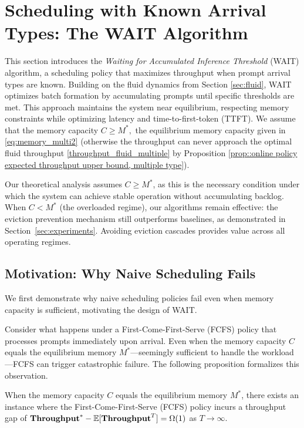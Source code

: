 \section{Scheduling with Known Arrival Types: The WAIT Algorithm}
\label{sec:wait}

This section introduces the \textit{Waiting for Accumulated Inference Threshold} (WAIT) algorithm, a scheduling policy that maximizes throughput when prompt arrival types are known. Building on the fluid dynamics from Section \ref{sec:fluid}, WAIT optimizes batch formation by accumulating prompts until specific thresholds are met. This approach maintains the system near equilibrium, respecting memory constraints while optimizing latency and time-to-first-token (TTFT). We assume that the memory capacity $C\ge M^*,$ the equilibrium memory capacity given in \eqref{eq:memory_multi2} (otherwise the throughput can never approach the optimal fluid throughput \eqref{throughput_fluid_multiple} by Proposition \ref{prop::online policy expected throughput upper bound, multiple type}).

\begin{remark}
\label{remark:memory_assumption}
Our theoretical analysis assumes $C \geq M^*$, as this is the necessary condition under which the system can achieve stable operation without accumulating backlog. When $C < M^*$ (the overloaded regime), our algorithms remain effective: the eviction prevention mechanism still outperforms baselines, as demonstrated in Section~\ref{sec:experiments}. Avoiding eviction cascades provides value across all operating regimes.
\end{remark}

\subsection{Motivation: Why Naive Scheduling Fails}
\label{subsec:wait_motivation}

We first demonstrate why naive scheduling policies fail even when memory capacity is sufficient, motivating the design of WAIT.

Consider what happens under a First-Come-First-Serve (FCFS) policy that processes prompts immediately upon arrival. Even when the memory capacity $C$ equals the equilibrium memory $M^*$---seemingly sufficient to handle the workload---FCFS can trigger catastrophic failure. The following proposition formalizes this observation.

\begin{proposition}\label{prop:lower_bound_FCFS}
When the memory capacity \(C\) equals the equilibrium memory \(M^*\), there exists an instance where the First-Come-First-Serve (FCFS) policy incurs a throughput gap of \(\textbf{Throughput}^* - \mathbb{E}[\textbf{Throughput}^T] = \Omega(1)\) as \(T \to \infty\).
\end{proposition}

